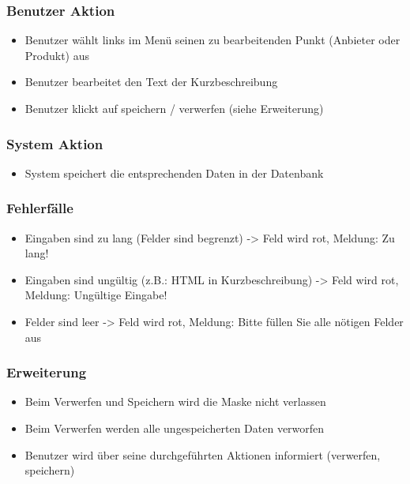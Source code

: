 \documentclass[a4paper,12pt]{article}
\begin{document}
\subsubsection{Benutzer Aktion}\label{benutzer-aktion-2}

\begin{itemize}
\item
  Benutzer wählt links im Menü seinen zu bearbeitenden Punkt (Anbieter
  oder Produkt) aus
\item
  Benutzer bearbeitet den Text der Kurzbeschreibung
\item
  Benutzer klickt auf speichern / verwerfen (siehe Erweiterung)
\end{itemize}

\subsubsection{System Aktion}\label{system-aktion-2}

\begin{itemize}
\item
  System speichert die entsprechenden Daten in der Datenbank
\end{itemize}

\subsubsection{Fehlerfälle}\label{fehlerfalle-2}

\begin{itemize}
\item
  Eingaben sind zu lang (Felder sind begrenzt) -\textgreater{} Feld wird
  rot, Meldung: Zu lang!
\item
  Eingaben sind ungültig (z.B.: HTML in Kurzbeschreibung)
  -\textgreater{} Feld wird rot, Meldung: Ungültige Eingabe!
\item
  Felder sind leer -\textgreater{} Feld wird rot, Meldung: Bitte füllen
  Sie alle nötigen Felder aus
\end{itemize}

\subsubsection{Erweiterung}\label{erweiterung-2}

\begin{itemize}

\item
  Beim Verwerfen und Speichern wird die Maske nicht verlassen
\item
  Beim Verwerfen werden alle ungespeicherten Daten verworfen
\item
  Benutzer wird über seine durchgeführten Aktionen informiert
  (verwerfen, speichern)
\end{itemize}
\end{document}
